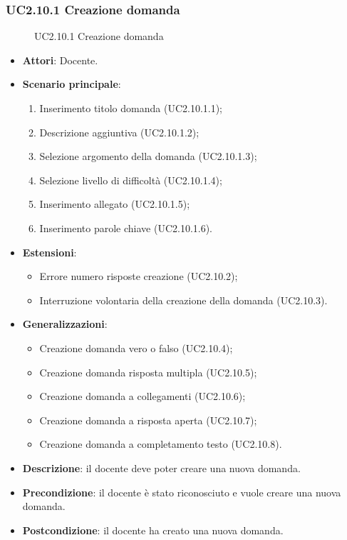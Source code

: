 \subsubsection{UC2.10.1 Creazione domanda}
\begin{figure}[H]
\centering
\noindent{}
\caption{UC2.10.1 Creazione domanda}
\end{figure}
\begin{itemize}
\item \textbf{Attori}: Docente.
\item \textbf{Scenario principale}:
\begin{enumerate}
\item Inserimento titolo domanda (UC2.10.1.1);
\item Descrizione aggiuntiva (UC2.10.1.2);
\item Selezione argomento della domanda (UC2.10.1.3);
\item Selezione livello di difficoltà (UC2.10.1.4);
\item Inserimento allegato (UC2.10.1.5);
\item Inserimento parole chiave (UC2.10.1.6).
\end{enumerate}
\item \textbf{Estensioni}:
\begin{itemize}
\item Errore numero risposte creazione (UC2.10.2);
\item Interruzione volontaria della creazione della domanda (UC2.10.3).
\end{itemize}
\item \textbf{Generalizzazioni}:
\begin{itemize}
\item Creazione domanda vero o falso (UC2.10.4);
\item Creazione domanda risposta multipla (UC2.10.5);
\item Creazione domanda a collegamenti (UC2.10.6);
\item Creazione domanda a risposta aperta (UC2.10.7);
\item Creazione domanda a completamento testo (UC2.10.8).
\end{itemize}
\item \textbf{Descrizione}: il docente deve poter creare una nuova domanda.
\item \textbf{Precondizione}: il docente è stato riconosciuto e vuole creare una nuova domanda.
\item \textbf{Postcondizione}: il docente ha creato una nuova domanda.
\end{itemize}

